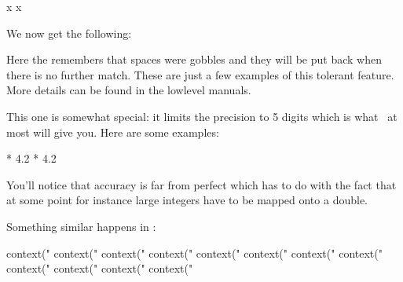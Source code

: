 \tolerant{}

\foo[?] x
\foo[?] [?] x
\stopbuffer

\typebuffer

We now get the following:

\getbuffer

Here the \type {#,} remembers that spaces were gobbles and they will be put back
when there is no further match. These are just a few examples of this tolerant
feature. More details can be found in the lowlevel manuals.

\stopnewprimitive

\startnewprimitive[title={\prm {tolimitedfloat}}]

This one is somewhat special: it limits the precision to 5 digits which is
what \TEX\ at most will give you. Here are some examples:

\startbuffer
{}
\the            {} * 4.2\relax
\tolimitedfloat {} * 4.2\relax
\tolimitedfloat {}\relax
\stopbuffer

\typebuffer[option=TEX]

You'll notice that accuracy is far from perfect which has to do
with the fact that at some point for instance large integers have
to be mapped onto a double.

\startlines
\getbuffer
\stoplines

Something similar happens in \LUA:

\startbuffer
\startluacode
    context("%
    context("%
    context("%
    context("%
    context("%
    context("%
    context("%
    context("%
    context("%
    context("%
    context("%
    context("%
\stopluacode
\stopbuffer

